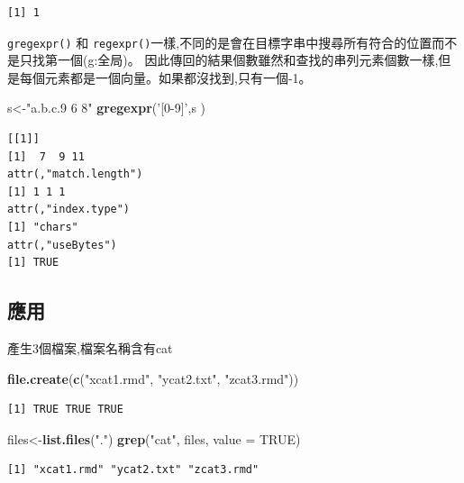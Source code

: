 \documentclass[]{book}
\newenvironment{Shaded}{\begin{snugshade}}{\end{snugshade}}
\newcommand{\DataTypeTok}[1]{\textcolor[rgb]{0.13,0.29,0.53}{#1}}
\newcommand{\KeywordTok}[1]{\textcolor[rgb]{0.13,0.29,0.53}{\textbf{#1}}}
\newcommand{\NormalTok}[1]{#1}
\newcommand{\OtherTok}[1]{\textcolor[rgb]{0.56,0.35,0.01}{#1}}
\newcommand{\StringTok}[1]{\textcolor[rgb]{0.31,0.60,0.02}{#1}}
\theoremstyle{definition}
\theoremstyle{definition}
\theoremstyle{definition}
\theoremstyle{remark}
\begin{document}
\begin{verbatim}
[1] 1
\end{verbatim}

\texttt{gregexpr()} 和
\texttt{regexpr()}一樣,不同的是會在目標字串中搜尋所有符合的位置而不是只找第一個(g:全局)。
因此傳回的結果個數雖然和查找的串列元素個數一樣,但是每個元素都是一個向量。如果都沒找到,只有一個-1。

\begin{Shaded}
\begin{Highlighting}[]
\NormalTok{s<-}\StringTok{"a.b.c.9 6 8"}
 \KeywordTok{gregexpr}\NormalTok{(}\StringTok{'[0-9]'}\NormalTok{,s ) }
\end{Highlighting}
\end{Shaded}

\begin{verbatim}
[[1]]
[1]  7  9 11
attr(,"match.length")
[1] 1 1 1
attr(,"index.type")
[1] "chars"
attr(,"useBytes")
[1] TRUE
\end{verbatim}

\subsection{應用}

產生3個檔案,檔案名稱含有cat

\begin{Shaded}
\begin{Highlighting}[]
\KeywordTok{file.create}\NormalTok{(}\KeywordTok{c}\NormalTok{(}\StringTok{"xcat1.rmd"}\NormalTok{, }\StringTok{"ycat2.txt"}\NormalTok{, }\StringTok{"zcat3.rmd"}\NormalTok{))}
\end{Highlighting}
\end{Shaded}

\begin{verbatim}
[1] TRUE TRUE TRUE
\end{verbatim}

\begin{Shaded}
\begin{Highlighting}[]
\NormalTok{files<-}\KeywordTok{list.files}\NormalTok{(}\StringTok{"."}\NormalTok{)}
\KeywordTok{grep}\NormalTok{(}\StringTok{"cat"}\NormalTok{, files, }\DataTypeTok{value =} \OtherTok{TRUE}\NormalTok{)}
\end{Highlighting}
\end{Shaded}

\begin{verbatim}
[1] "xcat1.rmd" "ycat2.txt" "zcat3.rmd"
\end{verbatim}
\end{document}

